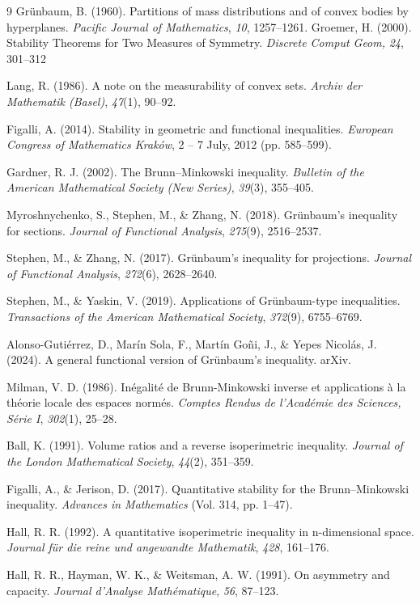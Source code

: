 \documentclass[12pt,reqno]{amsart}
\theoremstyle{plain}
\theoremstyle{definition}
\theoremstyle{remark}
\numberwithin{equation}{section}
\begin{document}
\begin{thebibliography}{9}
     Grünbaum, B. (1960). Partitions of mass distributions and of convex bodies by hyperplanes. \textit{Pacific Journal of Mathematics}, \textit{10}, 1257–1261.
     Groemer, H. (2000). Stability Theorems for Two Measures of Symmetry. \textit{Discrete Comput Geom,} \textit{24}, 301–312
    
     Lang, R. (1986). A note on the measurability of convex sets. \textit{Archiv der Mathematik (Basel)}, \textit{47}(1), 90–92.
    
     Figalli, A. (2014). Stability in geometric and functional inequalities. \textit{European Congress of Mathematics Kraków}, 2 – 7 July, 2012 (pp. 585–599).
    
     Gardner, R. J. (2002). The Brunn–Minkowski inequality. \textit{Bulletin of the American Mathematical Society (New Series)}, \textit{39}(3), 355–405.
    
     Myroshnychenko, S., Stephen, M., \& Zhang, N. (2018). Grünbaum's inequality for sections. \textit{Journal of Functional Analysis}, \textit{275}(9), 2516–2537.
    
     Stephen, M., \& Zhang, N. (2017). Grünbaum's inequality for projections. \textit{Journal of Functional Analysis}, \textit{272}(6), 2628–2640.
    
     Stephen, M., \& Yaskin, V. (2019). Applications of Grünbaum-type inequalities. \textit{Transactions of the American Mathematical Society}, \textit{372}(9), 6755–6769.
    
     Alonso-Gutiérrez, D., Marín Sola, F., Martín Goñi, J., \& Yepes Nicolás, J. (2024). A general functional version of Grünbaum's inequality. arXiv.
    
     Milman, V. D. (1986). Inégalité de Brunn-Minkowski inverse et applications à la théorie locale des espaces normés. \textit{Comptes Rendus de l'Académie des Sciences, Série I}, \textit{302}(1), 25–28.
    
     Ball, K. (1991). Volume ratios and a reverse isoperimetric inequality. \textit{Journal of the London Mathematical Society}, \textit{44}(2), 351–359.
    
     Figalli, A., \& Jerison, D. (2017). Quantitative stability for the Brunn–Minkowski inequality. \textit{Advances in Mathematics} (Vol. 314, pp. 1–47).

    
     Hall, R. R. (1992). A quantitative isoperimetric inequality in n-dimensional space. \textit{Journal für die reine und angewandte Mathematik}, \textit{428}, 161–176.
    
     Hall, R. R., Hayman, W. K., \& Weitsman, A. W. (1991). On asymmetry and capacity. \textit{Journal d’Analyse Mathématique}, \textit{56}, 87–123.
\end{thebibliography}
\end{document}
